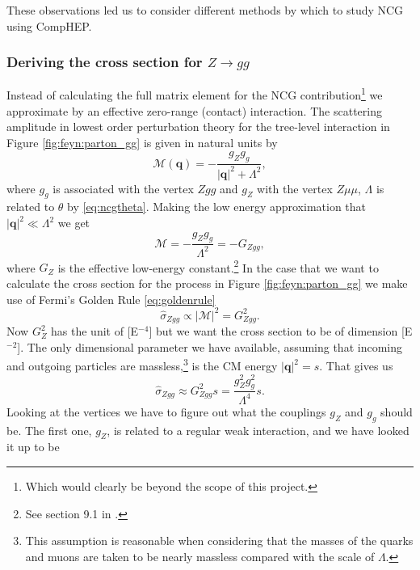 These observations led us to consider different methods by which to study NCG using CompHEP.

\subsubsection{Deriving the cross section for $Z \rightarrow gg$} \label{sec:derivcrosssection}
Instead of calculating the full matrix element for the NCG contribution\footnote{Which would clearly be beyond the scope of this project.} we approximate by an effective zero-range (contact) interaction. The scattering amplitude in lowest order perturbation theory for the tree-level interaction in Figure \ref{fig:feyn:parton_gg} is given in natural units by
\begin{equation}
	\mathcal{M}(\mathbf{q}) = -\frac{g_Z g_g }{|\mathbf{q}|^2 + \Lambda^2},
\end{equation}
where $g_g$ is associated with the vertex $Zgg$ and $g_Z$ with the vertex $Z\mu\mu$, $\Lambda$ is related to $\theta$ by \eqref{eq:ncgtheta}. Making the low energy approximation that $|\mathbf{q}|^2 \ll \Lambda^2$ we get
\begin{equation} \label{eq:scatteringamplitude}
	\mathcal{M} = -\frac{g_Z g_g}{\Lambda^2} = -G_{Zgg},
\end{equation}
where $G_Z$ is the effective low-energy constant.\footnote{See section 9.1 in \cite{martin1998pp}.} In the case that we want to calculate the cross section for the process in Figure \ref{fig:feyn:parton_gg} we make use of Fermi's Golden Rule \eqref{eq:goldenrule}
\begin{equation}
	\hat \sigma_{Zgg} \propto |\mathcal{M}|^2 = G_{Zgg}^2.
\end{equation}
Now $G_Z^2$ has the unit of [E$^{-4}$] but we want the cross section to be of dimension [E$^{-2}$]. The only dimensional parameter we have available, assuming that incoming and outgoing particles are massless,\footnote{This assumption is reasonable when considering that the masses of the quarks and muons are taken to be nearly massless compared with the scale of $\Lambda$.} is the CM energy $|\mathbf{q}|^2 = s$. That gives us
\begin{equation}
	\hat \sigma_{Zgg} \approx G_{Zgg}^2 s = \frac{g_Z^2 g_g^2}{\Lambda^4}s.
\end{equation}
Looking at the vertices we have to figure out what the couplings $g_Z$ and $g_g$ should be. The first one, $g_Z$, is related to a regular weak interaction, and we have looked it up to be \cite{bettini2008iep}
